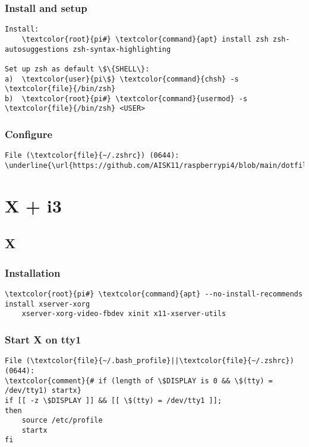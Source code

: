 \documentclass[10pt, a4paper, onecolumn, openany]{book} %
\begin{document}
\subsection{Install and setup}
\begin{Verbatim}[commandchars=\\\{\}]
Install:
    \textcolor{root}{pi#} \textcolor{command}{apt} install zsh zsh-autosuggestions zsh-syntax-highlighting
    
Set up zsh as default \$\{SHELL\}:
a)  \textcolor{user}{pi\$} \textcolor{command}{chsh} -s \textcolor{file}{/bin/zsh}
b)  \textcolor{root}{pi#} \textcolor{command}{usermod} -s \textcolor{file}{/bin/zsh} <USER>
\end{Verbatim}
\subsection{Configure}
\begin{Verbatim}[commandchars=\\\{\}]
File (\textcolor{file}{~/.zshrc}) (0644):
\underline{\url{https://github.com/AISK11/raspberrypi4/blob/main/dotfiles/.zshrc}}
\end{Verbatim}


\chapter{X + i3}
\section{X}
\subsection{Installation}
\begin{Verbatim}[commandchars=\\\{\}]
    \textcolor{root}{pi#} \textcolor{command}{apt} --no-install-recommends install xserver-xorg
    xserver-xorg-video-fbdev xinit x11-xserver-utils
\end{Verbatim}
\subsection{Start X on tty1}
\begin{Verbatim}[commandchars=\\\{\}]
File (\textcolor{file}{~/.bash_profile}||\textcolor{file}{~/.zshrc}) (0644):
\textcolor{comment}{# if (length of \$DISPLAY is 0 && \$(tty) = /dev/tty1) startx}
if [[ -z \$DISPLAY ]] && [[ \$(tty) = /dev/tty1 ]]; 
then
    source /etc/profile
    startx
fi
\end{Verbatim}
\end{document}
